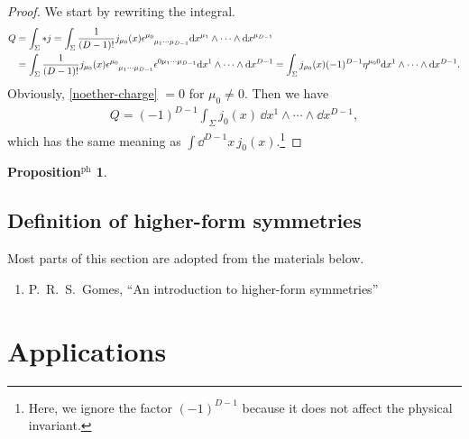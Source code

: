 \documentclass{article}
\theoremstyle{definition}
\newtheorem{propositionph}{Proposition$^\mathrm{ph}$}[section]
\numberwithin{equation}{section}
\begin{document}
\begin{proof}
  We start by rewriting the integral.
  \begin{align}
    Q &= \int_{\Sigma} *j = \int_{\Sigma} \frac{1}{(D - 1)!}j_{\mu_0}(x) \tensor{\epsilon}{^{\mu_0}_{\mu_1\cdots\mu_{D-1}}} \dd x^{\mu_1} \wedge \cdots \wedge \dd x^{\mu_{D-1}}
    \notag \\
      &= \int_{\Sigma} \frac{1}{(D - 1)!}j_{\mu_0}(x) \tensor{\epsilon}{^{\mu_0}_{\mu_1\cdots\mu_{D-1}}}\tensor{\epsilon}{^{0\mu_1\cdots\mu_{D-1}}}
        \dd x^{1} \wedge \cdots \wedge \dd x^{D-1} = \int_{\Sigma} j_{\mu_0}(x) (-1)^{D-1}\eta^{\mu_0 0} \dd x^{1} \wedge \cdots \wedge \dd x^{D-1}. \label{noether-charge}
  \end{align}
  Obviously, \eqref{noether-charge} $= 0$ for $\mu_0 \ne 0$. Then we have
  \begin{align}
    Q =  (-1)^{D-1}  \int_{\Sigma} j_{0}(x) \, \dd x^{1} \wedge \cdots \wedge \dd x^{D-1},
  \end{align}
  which has the same meaning as ${\displaystyle \int \dd^{D-1}x}\, j_0(x)$.\footnote{Here, we ignore the factor $(-1)^{D-1}$ because it does not affect the physical invariant.}
\end{proof}

\begin{propositionph}
\end{propositionph}

\subsection{Definition of higher-form symmetries}
Most parts of this section are adopted from the materials below.
\begin{enumerate}
\item [\cite{Gomes:2023ahz}] P.~R.~S.~Gomes,
``An introduction to higher-form symmetries''
\end{enumerate}

\section{Applications}

\nocite{*}
% 
% 
\end{document}

